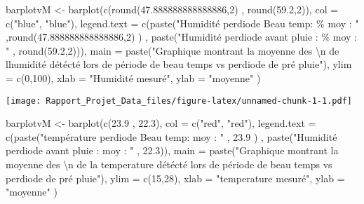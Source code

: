 \documentclass[
]{article}
\newenvironment{Shaded}{\begin{snugshade}}{\end{snugshade}}
\newcommand{\AttributeTok}[1]{\textcolor[rgb]{0.77,0.63,0.00}{#1}}
\newcommand{\DecValTok}[1]{\textcolor[rgb]{0.00,0.00,0.81}{#1}}
\newcommand{\FloatTok}[1]{\textcolor[rgb]{0.00,0.00,0.81}{#1}}
\newcommand{\FunctionTok}[1]{\textcolor[rgb]{0.00,0.00,0.00}{#1}}
\newcommand{\NormalTok}[1]{#1}
\newcommand{\OtherTok}[1]{\textcolor[rgb]{0.56,0.35,0.01}{#1}}
\newcommand{\SpecialCharTok}[1]{\textcolor[rgb]{0.00,0.00,0.00}{#1}}
\newcommand{\StringTok}[1]{\textcolor[rgb]{0.31,0.60,0.02}{#1}}
\begin{document}
\begin{Shaded}
\begin{Highlighting}[]
\NormalTok{barplotvM }\OtherTok{\textless{}{-}} \FunctionTok{barplot}\NormalTok{(}\FunctionTok{c}\NormalTok{(}\FunctionTok{round}\NormalTok{(}\FloatTok{47.888888888888886}\NormalTok{,}\DecValTok{2}\NormalTok{) , }\FunctionTok{round}\NormalTok{(}\FloatTok{59.2}\NormalTok{,}\DecValTok{2}\NormalTok{)),}
                       \AttributeTok{col =} \FunctionTok{c}\NormalTok{(}\StringTok{"blue"}\NormalTok{, }\StringTok{"blue"}\NormalTok{),}
                       \AttributeTok{legend.text =} \FunctionTok{c}\NormalTok{(}\FunctionTok{paste}\NormalTok{(}\StringTok{"Humidité perdiode Beau temp: \% moy : "}\NormalTok{ ,}\FunctionTok{round}\NormalTok{(}\FloatTok{47.888888888888886}\NormalTok{,}\DecValTok{2}\NormalTok{) ) ,}
                                       \FunctionTok{paste}\NormalTok{(}\StringTok{"Humidité perdiode avant pluie  : \% moy : "}\NormalTok{ , }\FunctionTok{round}\NormalTok{(}\FloatTok{59.2}\NormalTok{,}\DecValTok{2}\NormalTok{))),}
                       \AttributeTok{main =} \FunctionTok{paste}\NormalTok{(}\StringTok{"Graphique montrant la moyenne des }\SpecialCharTok{\textbackslash{}n}\StringTok{ de l\textquotesingle{}humidité détécté lors de période de beau temps vs perdiode de pré pluie"}\NormalTok{),}
                       \AttributeTok{ylim =} \FunctionTok{c}\NormalTok{(}\DecValTok{0}\NormalTok{,}\DecValTok{100}\NormalTok{),}
                       \AttributeTok{xlab =} \StringTok{"Humidité mesuré"}\NormalTok{,}
                       \AttributeTok{ylab =} \StringTok{"moyenne"}
\NormalTok{)}
\end{Highlighting}
\end{Shaded}

\texttt{[image: Rapport\_Projet\_Data\_files/figure-latex/unnamed-chunk-1-1.pdf]}

\begin{Shaded}
\begin{Highlighting}[]
\NormalTok{barplotvM }\OtherTok{\textless{}{-}} \FunctionTok{barplot}\NormalTok{(}\FunctionTok{c}\NormalTok{(}\FloatTok{23.9}\NormalTok{ , }\FloatTok{22.3}\NormalTok{),}
                       \AttributeTok{col =} \FunctionTok{c}\NormalTok{(}\StringTok{"red"}\NormalTok{, }\StringTok{"red"}\NormalTok{),}
                       \AttributeTok{legend.text =} \FunctionTok{c}\NormalTok{(}\FunctionTok{paste}\NormalTok{(}\StringTok{"température perdiode Beau temp:  moy : "}\NormalTok{ , }\FloatTok{23.9}\NormalTok{ ) ,}
                                       \FunctionTok{paste}\NormalTok{(}\StringTok{"Humidité perdiode avant pluie  :  moy : "}\NormalTok{ , }\FloatTok{22.3}\NormalTok{)),}
                       \AttributeTok{main =} \FunctionTok{paste}\NormalTok{(}\StringTok{"Graphique montrant la moyenne des }\SpecialCharTok{\textbackslash{}n}\StringTok{ de la temperature détécté lors de période de beau temps vs perdiode de pré pluie"}\NormalTok{),}
                       \AttributeTok{ylim =} \FunctionTok{c}\NormalTok{(}\DecValTok{15}\NormalTok{,}\DecValTok{28}\NormalTok{),}
                       \AttributeTok{xlab =} \StringTok{"temperature mesuré"}\NormalTok{,}
                       \AttributeTok{ylab =} \StringTok{"moyenne"}
\NormalTok{)}
\end{Highlighting}
\end{Shaded}
\end{document}
